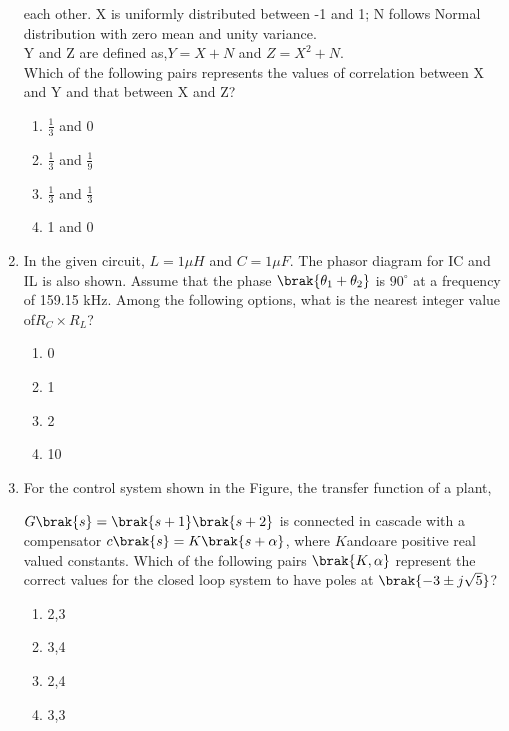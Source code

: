 \begin{enumerate}[label=\thesubsection.\arabic*,ref=\thesubsection.\theenumi]
each other. X is uniformly distributed between -1 and 1; N follows Normal
distribution with zero mean and unity variance.\\
Y and Z are defined as,$Y = X+N$ and $Z = X^2 +N$.\\
Which of the following pairs represents the values of correlation between X and Y
and that between X and Z? 
\begin{enumerate}
	\item $\frac{1}{3}$ and 0
	\item $\frac{1}{3}$ and $\frac{1}{9}$
	\item $\frac{1}{3}$ and $\frac{1}{3}$
	\item 1 and 0
\end{enumerate}
\item In the given circuit, $L = 1 \mu H$ and $C = 1 \mu F$. The phasor diagram for IC and IL is
	also shown. Assume that the phase $\brak{\theta_1 + \theta_2}$ is $90^\circ$ at a frequency of 159.15 kHz.
Among the following options, what is the nearest integer value of$ R_C\times  R_L$?
\begin{multicols}{4}
	\begin{enumerate}
		\item 0
		\item 1
		\item 2
		\item 10
	\end{enumerate}
\end{multicols}
\item For the control system shown in the Figure, the transfer function of a plant,

	$G\brak{s} = \brak{s+1}\brak{s+2}$ is connected in cascade with a compensator
$c\brak{s} = K \brak{s + \alpha}$, where $K $and$ \alpha $are positive real valued constants.
Which of the following pairs $\brak{K, \alpha}$ represent the correct values for the closed
loop system to have poles at $\brak{-3 \pm j\sqrt{5}}$?
\begin{multicols}{4}
	\begin{enumerate}
		\item 2,3
		\item 3,4
		\item 2,4
		\item 3,3
	\end{enumerate}
\end{multicols}



\end{enumerate}
